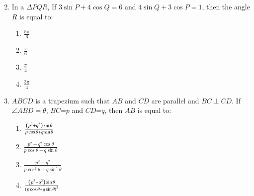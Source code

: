 \documentclass[journal,12pt,twocolumn]{IEEEtran}
\theoremstyle{remark}
\begin{document}
\begin{enumerate}
\begin{multicols}{2}
\begin{enumerate}
\end{enumerate} 
\end{multicols}
\item In a ${\Delta PQR}$, If $3 \sin {P} + 4 \cos {Q}=6$ and $4\sin {Q}+3\cos {P}=1$, then the angle ${R}$ is equal to:
\hfill{}
\begin{multicols}{4}
\begin{enumerate}
\item $\frac{5\pi}{6}$
\columnbreak
\item $\frac{\pi}{6}$
\columnbreak
\item $\frac{\pi}{4}$
\columnbreak
\item $\frac{3\pi}{4}$
\end{enumerate} 
\end{multicols}
\item $ABCD$ is a trapezium such that $AB$ and $CD$ are parallel and $BC\perp CD$. If $\angle ABD=\theta$, $BC$=$p$ and $CD$=$q$, then $AB$ is equal to:
\hfill{}
\begin{multicols}{2} 
\begin{enumerate}
\item $\frac{\left(p^2+q^2\right)\sin\theta}{p\cos\theta+q\sin\theta}$
\item $\frac{p^2+q^2\cos\theta}{p\cos\theta+q\sin\theta}$
\columnbreak
\item $\frac{p^2+q^2}{p\cos^2 \theta+q\sin^2 \theta}$
\item $\frac{\left(p^2+q^2\right)\sin\theta}{\left(p\cos\theta+q\sin\theta\right)^2}$
\end{enumerate}
\end{multicols}
\end{enumerate}
\end{document}
